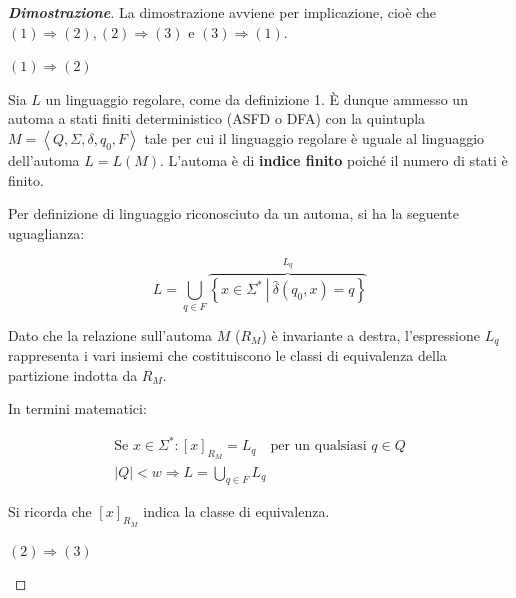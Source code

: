 \documentclass[a4paper]{article}
\begin{document}
	\begin{proof}[\textbf{Dimostrazione}]
		La dimostrazione avviene per implicazione, cioè che $(1) \Rightarrow (2), (2) \Rightarrow (3)$ e $(3) \Rightarrow (1)$.

		\begin{center}
			\item[\ding{42}] $(1) \Rightarrow (2)$
		\end{center}
		
		\noindent
		Sia $L$ un linguaggio regolare, come da definizione 1. È dunque ammesso un automa a stati finiti deterministico (ASFD o DFA) con la quintupla $M = \left\langle Q, \Sigma, \delta, q_{0}, F \right\rangle$ tale per cui il linguaggio regolare è uguale al linguaggio dell'automa $L = L\left(M\right)$. L'automa è di \textbf{indice finito} poiché il numero di stati è finito.\newline
		
		\noindent
		Per definizione di linguaggio riconosciuto da un automa, si ha la seguente uguaglianza:
		
		\begin{equation*}
			L = \bigcup_{q \in F} \overbrace{\left\{x \in \Sigma^{*} \: \left| \: \hat{\delta}\left(q_{0}, x\right) = q \right.\right\}}^{L_{q}}
		\end{equation*}
	
		\noindent
		Dato che la relazione sull'automa $M$ ($R_{M}$) è invariante a destra, l'espressione $L_{q}$ rappresenta i vari insiemi che costituiscono le classi di equivalenza della partizione indotta da $R_{M}$.\newline
		
		\noindent
		In termini matematici:
		
		\begin{gather*}
			\text{Se } x \in \Sigma^{*} : \left[x\right]_{R_{M}} = L_{q} \hspace{1em} \text{per un qualsiasi } q \in Q \\
			|Q| < w \Rightarrow L = \bigcup_{q \in F} L_{q}
		\end{gather*}
	
		\noindent
		Si ricorda che $\left[x\right]_{R_{M}}$ indica la classe di equivalenza.
		
		\newpage
		
		\begin{center}
			\item[\ding{42}] $(2) \Rightarrow (3)$
		\end{center}
		

\end{proof}
\end{document}
